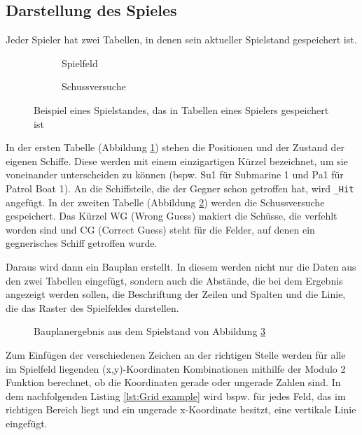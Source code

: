 \documentclass{article}
\begin{document}
\subsection{Darstellung des Spieles}
    Jeder Spieler hat zwei Tabellen, in denen sein aktueller Spielstand gespeichert ist.

\begin{figure}[H]
    \begin{subfigure}{0.50\textwidth}
    \centering
    
    \caption{Spielfeld}
    \label{fig:board}
    \end{subfigure}
    \begin{subfigure}{0.50\textwidth}
    \centering
    
    \caption{Schussversuche}
    \label{fig:guesses}
\end{subfigure}
\caption{Beispiel eines Spielstandes, das in Tabellen eines Spielers gespeichert ist}
\label{fig:Boards}
\end{figure}

\par
    In der ersten Tabelle (Abbildung \ref{fig:board}) stehen die Positionen und der Zustand der eigenen Schiffe. Diese werden mit einem einzigartigen Kürzel bezeichnet, um sie voneinander unterscheiden zu können (bspw. Su1 für Submarine 1 und Pa1 für Patrol Boat 1). An die Schiffsteile, die der Gegner schon getroffen hat, wird \verb$_Hit$ angefügt. In der zweiten Tabelle (Abbildung \ref{fig:guesses}) werden die Schussversuche gespeichert. Das Kürzel WG (Wrong Guess) makiert die Schüsse, die verfehlt worden sind und CG (Correct Guess) steht für die Felder, auf denen ein gegnerisches Schiff getroffen wurde.\newline

\par
    Daraus wird dann ein Bauplan erstellt. In diesem werden nicht nur die Daten aus den zwei Tabellen eingefügt, sondern auch die Abstände, die bei dem Ergebnis angezeigt werden sollen, die Beschriftung der Zeilen und Spalten und die Linie, die das Raster des Spielfeldes darstellen.

\begin{figure}[H]
    \centering
    
    \caption{Bauplanergebnis aus dem Spielstand von Abbildung \ref{fig:Boards}}
    \label{fig:blueprint}
\end{figure}

\par
    Zum Einfügen der verschiedenen Zeichen an der richtigen Stelle werden für alle im Spielfeld liegenden (x,y)-Koordinaten Kombinationen mithilfe der Modulo 2 Funktion berechnet, ob die Koordinaten gerade oder ungerade Zahlen sind. In dem nachfolgenden Listing \ref{lst:Grid example} wird bspw. für jedes Feld, das im richtigen Bereich liegt und ein ungerade x-Koordinate besitzt, eine vertikale Linie eingefügt.
\end{document}
